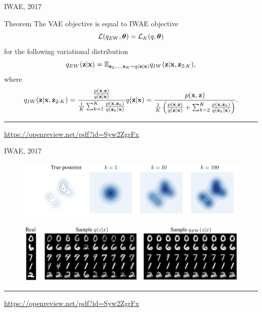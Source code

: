 \begin{frame}{IWAE, 2017}
\begin{block}{Theorem}
	The VAE objective is equal to IWAE objective 
	\[
	\mathcal{L}(q_{EW}, \boldsymbol{\theta}) = \mathcal{L}_K(q, \boldsymbol{\theta})
	\]
	for the following variational distribution
	\[
	q_{EW}(\mathbf{z} | \mathbf{x}) = \mathbb{E}_{\mathbf{z}_2, \dots, \mathbf{z}_K \sim q(\mathbf{z} | \mathbf{x})} q_{IW}(\mathbf{z} | \mathbf{x}, \mathbf{z}_{2:K}),
	\]
	where \[
	q_{IW}(\mathbf{z} | \mathbf{x}, \mathbf{z}_{2:K}) = \frac{\frac{p(\mathbf{x}, \mathbf{z})}{q(\mathbf{z} | \mathbf{x})}}{\frac{1}{K} \sum_{k=1}^K \frac{p(\mathbf{x}, \mathbf{z}_k)}{q(\mathbf{z}_k | \mathbf{x})}} q(\mathbf{z} | \mathbf{x}) = \frac{p(\mathbf{x}, \mathbf{z})}{\frac{1}{K}\left( \frac{p(\mathbf{x}, \mathbf{z})}{q(\mathbf{z} | \mathbf{x})} + \sum_{k=2}^K \frac{p(\mathbf{x}, \mathbf{z}_k)}{q(\mathbf{z}_k | \mathbf{x})}\right)}.
	\]
\end{block}

\vfill
\hrule\medskip
{\scriptsize \href{https://openreview.net/pdf?id=Syw2ZgrFx}{https://openreview.net/pdf?id=Syw2ZgrFx}}
\end{frame}
\begin{frame}{IWAE, 2017}
\begin{figure}
	\centering
	\includegraphics[width=\linewidth]{figs/IWAE_1.png}
\end{figure}
\begin{figure}
	\centering
	\includegraphics[width=\linewidth]{figs/IWAE_2.png}
\end{figure}

\vfill
\hrule\medskip
{\scriptsize \href{https://openreview.net/pdf?id=Syw2ZgrFx}{https://openreview.net/pdf?id=Syw2ZgrFx}}
\end{frame}
